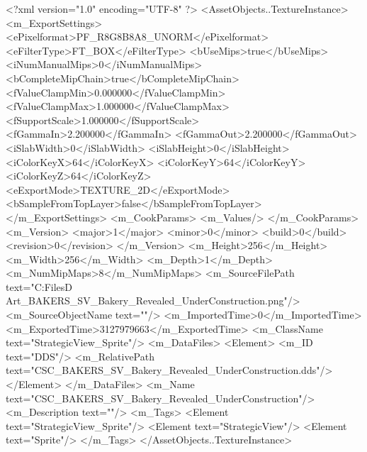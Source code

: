 <?xml version="1.0" encoding="UTF-8" ?>
<AssetObjects..TextureInstance>
	<m_ExportSettings>
		<ePixelformat>PF_R8G8B8A8_UNORM</ePixelformat>
		<eFilterType>FT_BOX</eFilterType>
		<bUseMips>true</bUseMips>
		<iNumManualMips>0</iNumManualMips>
		<bCompleteMipChain>true</bCompleteMipChain>
		<fValueClampMin>0.000000</fValueClampMin>
		<fValueClampMax>1.000000</fValueClampMax>
		<fSupportScale>1.000000</fSupportScale>
		<fGammaIn>2.200000</fGammaIn>
		<fGammaOut>2.200000</fGammaOut>
		<iSlabWidth>0</iSlabWidth>
		<iSlabHeight>0</iSlabHeight>
		<iColorKeyX>64</iColorKeyX>
		<iColorKeyY>64</iColorKeyY>
		<iColorKeyZ>64</iColorKeyZ>
		<eExportMode>TEXTURE_2D</eExportMode>
		<bSampleFromTopLayer>false</bSampleFromTopLayer>
	</m_ExportSettings>
	<m_CookParams>
		<m_Values/>
	</m_CookParams>
	<m_Version>
		<major>1</major>
		<minor>0</minor>
		<build>0</build>
		<revision>0</revision>
	</m_Version>
	<m_Height>256</m_Height>
	<m_Width>256</m_Width>
	<m_Depth>1</m_Depth>
	<m_NumMipMaps>8</m_NumMipMaps>
	<m_SourceFilePath text="C:\Users\Shadow\Desktop\Working Files\2D Art\Quarters\Bakers\StrategicView\CSC_BAKERS_SV_Bakery_Revealed_UnderConstruction.png"/>
	<m_SourceObjectName text=""/>
	<m_ImportedTime>0</m_ImportedTime>
	<m_ExportedTime>3127979663</m_ExportedTime>
	<m_ClassName text="StrategicView_Sprite"/>
	<m_DataFiles>
		<Element>
			<m_ID text="DDS"/>
			<m_RelativePath text="CSC_BAKERS_SV_Bakery_Revealed_UnderConstruction.dds"/>
		</Element>
	</m_DataFiles>
	<m_Name text="CSC_BAKERS_SV_Bakery_Revealed_UnderConstruction"/>
	<m_Description text=""/>
	<m_Tags>
		<Element text="StrategicView_Sprite"/>
		<Element text="StrategicView"/>
		<Element text="Sprite"/>
	</m_Tags>
</AssetObjects..TextureInstance>

